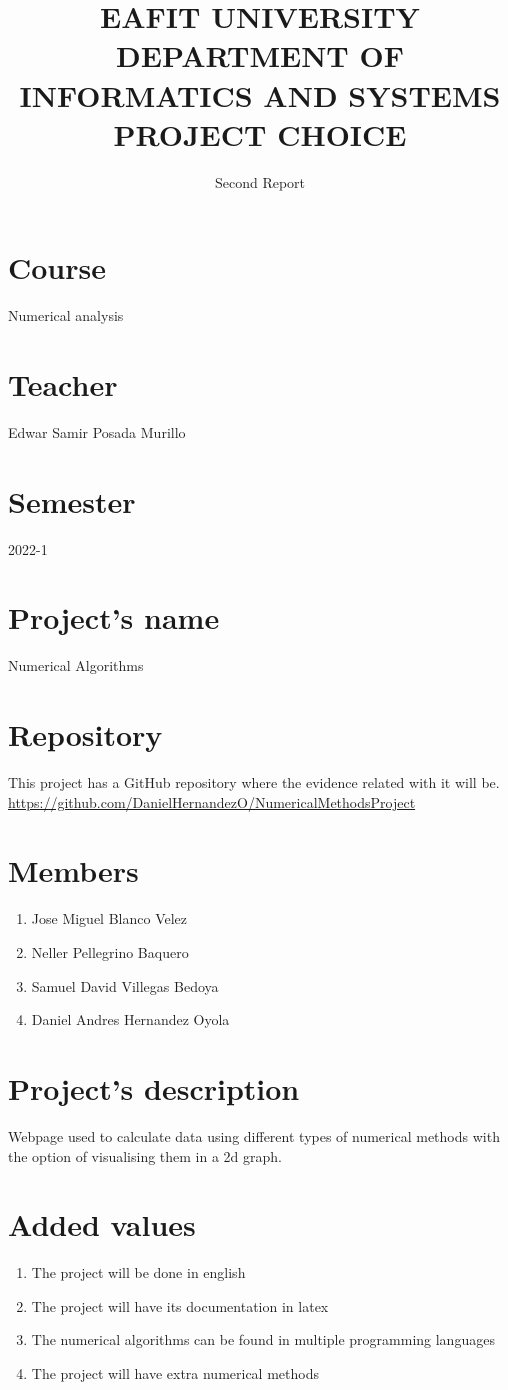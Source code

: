 \documentclass{article}
\title{EAFIT UNIVERSITY \\
    \large DEPARTMENT OF INFORMATICS AND SYSTEMS\\
     PROJECT CHOICE}
\author{Second Report}
\begin{document}
\maketitle

\section*{Course}
Numerical analysis
\section*{Teacher}
Edwar Samir Posada Murillo
\section*{Semester} 
2022-1
\section*{Project's name}
Numerical Algorithms
\section*{Repository}
This project has a GitHub repository where the evidence related with it will be. \url{https://github.com/DanielHernandezO/NumericalMethodsProject}
\section*{Members}
    \begin{enumerate}
        \item Jose Miguel Blanco Velez
        \item Neller Pellegrino Baquero
        \item Samuel David Villegas Bedoya
        \item Daniel Andres Hernandez Oyola
    \end{enumerate}
\section*{Project's description}
Webpage used to calculate data using different types of numerical methods with the option of visualising them in a 2d graph.
\section*{Added values}
    \begin{enumerate}
        \item The project will be done in english
        \item The project will have its documentation in latex
        \item The numerical algorithms can be found in multiple programming languages
        \item The project will have extra numerical methods
    \end{enumerate}
\end{document}

